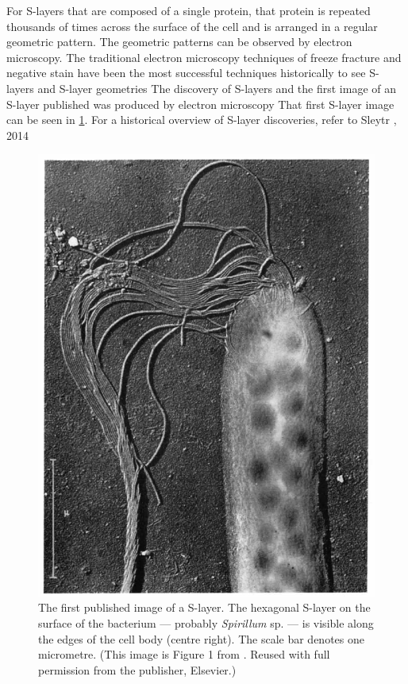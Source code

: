 For \acp{S-layer} that are composed of a single protein, that protein is repeated thousands of times across the surface of the cell and is arranged in a regular geometric pattern.
The geometric patterns can be observed by electron microscopy. The traditional electron microscopy techniques of freeze fracture and negative stain have been the most successful
techniques historically to see \acp{S-layer} and \ac{S-layer} geometries The discovery of \acp{S-layer} and the first image of an \ac{S-layer}
published was produced by electron microscopy That first \ac{S-layer} image can be seen in \cref{fig:firstslayer}. For a historical overview
of \ac{S-layer} discoveries, refer to Sleytr \etal, 2014

\begin{figure}[p] %
  \begin{center}
    \includegraphics{intro/img/firstslayer.pdf}
  \end{center}
  \caption[The first published image of a \ac{S-layer}]{The first published image of a \ac{S-layer}. The hexagonal \ac{S-layer} on the surface of the bacterium --- probably
\textit{Spirillum} sp. --- is visible along the edges of the cell body (centre right). The scale bar denotes one micrometre. (This image is Figure 1 from .
Reused with full permission from the publisher, Elsevier.)}
  \label{fig:firstslayer}
\end{figure}

